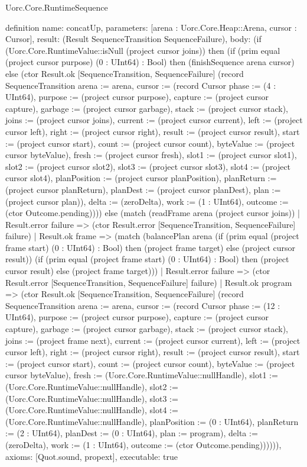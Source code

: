 \begin{lexlean}{Uorc.Core.RuntimeSequence}
\begin{semanticmodule}
definition{
  name: concatUp,
  parameters: [arena : Uorc.Core.Heap::Arena, cursor : Cursor],
  result: (Result SequenceTransition SequenceFailure),
  body: (if (Uorc.Core.RuntimeValue::isNull (project cursor joins)) then (if (prim equal (project cursor purpose) (0 : UInt64) : Bool) then (finishSequence arena cursor) else (ctor Result.ok [SequenceTransition, SequenceFailure] (record SequenceTransition {arena := arena, cursor := (record Cursor {phase := (4 : UInt64), purpose := (project cursor purpose), capture := (project cursor capture), garbage := (project cursor garbage), stack := (project cursor stack), joins := (project cursor joins), current := (project cursor current), left := (project cursor left), right := (project cursor right), result := (project cursor result), start := (project cursor start), count := (project cursor count), byteValue := (project cursor byteValue), fresh := (project cursor fresh), slot1 := (project cursor slot1), slot2 := (project cursor slot2), slot3 := (project cursor slot3), slot4 := (project cursor slot4), planPosition := (project cursor planPosition), planReturn := (project cursor planReturn), planDest := (project cursor planDest), plan := (project cursor plan)}), delta := (zeroDelta), work := (1 : UInt64), outcome := (ctor Outcome.pending)}))) else (match (readFrame arena (project cursor joins))
    | Result.error failure => (ctor Result.error [SequenceTransition, SequenceFailure] failure)
    | Result.ok frame => (match (balancePlan arena (if (prim equal (project frame start) (0 : UInt64) : Bool) then (project frame target) else (project cursor result)) (if (prim equal (project frame start) (0 : UInt64) : Bool) then (project cursor result) else (project frame target)))
      | Result.error failure => (ctor Result.error [SequenceTransition, SequenceFailure] failure)
      | Result.ok program => (ctor Result.ok [SequenceTransition, SequenceFailure] (record SequenceTransition {arena := arena, cursor := (record Cursor {phase := (12 : UInt64), purpose := (project cursor purpose), capture := (project cursor capture), garbage := (project cursor garbage), stack := (project cursor stack), joins := (project frame next), current := (project cursor current), left := (project cursor left), right := (project cursor right), result := (project cursor result), start := (project cursor start), count := (project cursor count), byteValue := (project cursor byteValue), fresh := (Uorc.Core.RuntimeValue::nullHandle), slot1 := (Uorc.Core.RuntimeValue::nullHandle), slot2 := (Uorc.Core.RuntimeValue::nullHandle), slot3 := (Uorc.Core.RuntimeValue::nullHandle), slot4 := (Uorc.Core.RuntimeValue::nullHandle), planPosition := (0 : UInt64), planReturn := (2 : UInt64), planDest := (0 : UInt64), plan := program}), delta := (zeroDelta), work := (1 : UInt64), outcome := (ctor Outcome.pending)}))))),
  axioms: [Quot.sound, propext],
  executable: true
}


\end{semanticmodule}
\end{lexlean}
